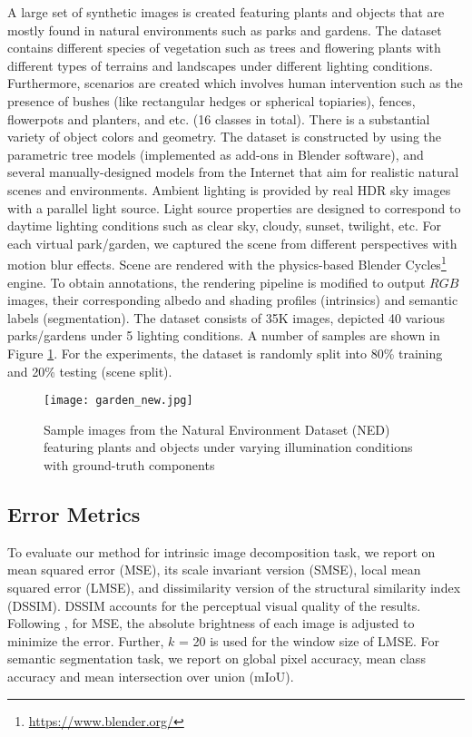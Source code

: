 \documentclass[runningheads]{llncs}
\begin{document}
A large set of synthetic images is created featuring plants and objects that are mostly found in natural environments such as parks and gardens. The dataset contains different species of vegetation such as trees and flowering plants with different types of terrains and landscapes under different lighting conditions. Furthermore, scenarios are created which involves human intervention such as the presence of bushes (like rectangular hedges or spherical topiaries), fences, flowerpots and planters, and etc. (16 classes in total). There is a substantial variety of object colors and geometry. The dataset is constructed by using the parametric tree models \cite{Weber} (implemented as 
add-ons in Blender software), and several manually-designed models from the Internet that aim for 
realistic natural scenes and environments. Ambient lighting is provided by real HDR sky images with a parallel light source. Light source properties are designed to correspond to daytime lighting conditions such as clear sky, cloudy, sunset, twilight, etc. For each virtual park/garden, we captured the scene from different perspectives with motion blur effects. Scene are rendered with the physics-based Blender Cycles\footnote{\url{https://www.blender.org/}} 
engine. To obtain annotations, the rendering pipeline is modified to output $RGB$  images, their corresponding albedo and shading profiles (intrinsics) and semantic labels (segmentation). The dataset consists of 35K images, depicted 40 various parks/gardens under 5 lighting conditions. A number of  samples are shown in Figure \ref{fig:garden}. For the experiments, the dataset is randomly split into 80\% training and 20\% testing (scene split).

\begin{figure}[t]
    \centering
    \texttt{[image: garden\_new.jpg]}
    \caption{Sample images from the Natural Environment Dataset (NED) featuring plants and objects under varying illumination conditions with ground-truth components}
    \label{fig:garden}
\end{figure}

\subsection{Error Metrics}
To evaluate our method for intrinsic image decomposition task, we report on mean squared error (MSE), its scale invariant version (SMSE), local mean squared error (LMSE), and dissimilarity version of the structural similarity index (DSSIM). DSSIM accounts for the perceptual visual quality of the results. Following \cite{mit}, for MSE, the absolute brightness of each image is adjusted to minimize the error. Further, $k$ = 20 is used for the window size of LMSE. For semantic segmentation task, we report on global pixel accuracy, mean class accuracy and mean intersection over union (mIoU).
\end{document}
